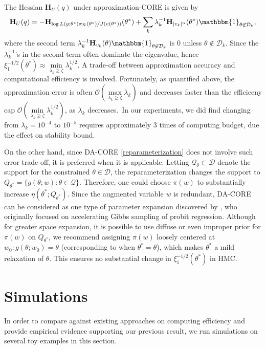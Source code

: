 \documentclass[10pt,fleqn]{article}
\newcommand{\mc}[1]{\mathcal{#1}}
\DeclareMathOperator{\1}{\mathbbm{1}}
\newcommand{\hess}{\mathbf{H}} %
\begin{document}
The Hessian $\hess_U(q)$ under approximation-CORE is given by
\begin{equation}
\label{eq:hessian_extrinsic}
\hess_U(q) = -\hess_{\log L(y;\theta^*) \pi_{\mc
R}(\theta^*) /J(v(\theta^*)) }(\theta^*)+\sum_k \lambda_k^{-1} \hess_{|v_k|^\alpha}(\theta^*) \mathbbm{1}_{\theta\not\in \mc D_k},
\end{equation}
where the second term $\lambda_k^{-1} \hess_{v_k}(\theta) \mathbbm{1}_{\theta\not\in \mc D_k}$ is $0$ unless $\theta\not\in \mc D_k$. Since the $\lambda^{-1}_k$'s
in the second term often dominate the eigenvalue, hence $\xi^{-1/2}_1(\theta^*)\approx
\underset{\lambda_k\ge \zeta}{\min}\lambda_k^{1/2}$. A trade-off between approximation accuracy and computational efficiency is involved. Fortunately, as quantified above, the approximation error is often $\mc O( \underset{\lambda_k\ge \zeta}{\max}\lambda_k)
$ and decreases faster than the efficiceny cap $\mc O( \underset{\lambda_k\ge \zeta}{\min}\lambda_k^{1/2})$, as $\lambda_k$ decreases.\ In our experiments, we did find changing from $\lambda_{k}=10^{-4}$ to $10^{-5}$ requires approximately $3$ times of computing budget, due the effect on stability
bound.


On the other hand, since DA-CORE \eqref{reparameterization} does not involve such error trade-off, it is preferred when it is applicable. Letting $\mc Q_\theta\subset \mc D$ denote the support for the constrained $\theta\in \mc D$, the reparameterization changes the support to $Q_{\theta^*}=\{g(\theta;w):\theta\in \mc Q\}$. Therefore, one could choose $\pi(w)$ to substantially increase $\eta(\theta^*; Q_{\theta^*})$.
Since the augmented variable $w$ is redundant, DA-CORE can
be considered as one type of parameter expansion  discovered by \cite{liu1999parameter}, who originally
focused on accelerating  Gibbs sampling of probit regression. 
Although for
greater space expansion,  it is possible to use diffuse or even improper prior for $\pi(w)$ on $Q_{\theta^*}$,
 we recommend assigning $\pi(w)$ loosely centered at $w_0:g(\theta;w_0)=\theta$ (corresponding to when $\theta^*=\theta$), which makes $\theta^*$ a mild relaxation of $\theta$. This ensures no substantial change in $\xi^{-1/2}_1(\theta^*)$ in HMC.

\section{Simulations}
In order to compare against existing approaches on computing efficiency and provide empirical evidence
supporting our previous result, we run simulations on several toy examples
 in this section.
   
\end{document}
